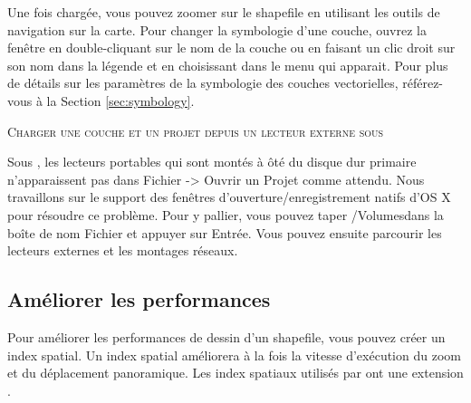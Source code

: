 Une fois chargée, vous pouvez zoomer sur le shapefile en utilisant les outils de navigation sur la carte.
Pour changer la symbologie d'une couche, ouvrez la fenêtre  en double-cliquant sur le nom de la couche ou en faisant un clic droit sur son nom dans la légende et en choisissant  dans le menu qui apparait. Pour plus de détails sur les paramètres de la symbologie des couches vectorielles, référez-vous à la Section \ref{sec:symbology}.

\begin{Tip}\caption{\textsc{Charger une couche et un projet depuis un lecteur externe sous \mac}}
Sous \mac, les lecteurs portables qui sont montés à ôté du disque dur primaire n'apparaissent pas dans Fichier -> Ouvrir un Projet comme attendu. Nous travaillons sur le support des fenêtres d'ouverture/enregistrement natifs d'OS X pour résoudre ce problème. Pour y pallier, vous pouvez taper \og /Volumes\fg dans la boîte de nom Fichier et appuyer sur Entrée. Vous pouvez ensuite parcourir les lecteurs externes et les montages réseaux.
\end{Tip}

\subsection{Améliorer les performances}

Pour améliorer les performances de dessin d'un shapefile, vous pouvez créer un index spatial. Un  index spatial améliorera à la fois la vitesse d'exécution du zoom et du déplacement panoramique. Les index spatiaux utilisés par \qg ont une extension .

